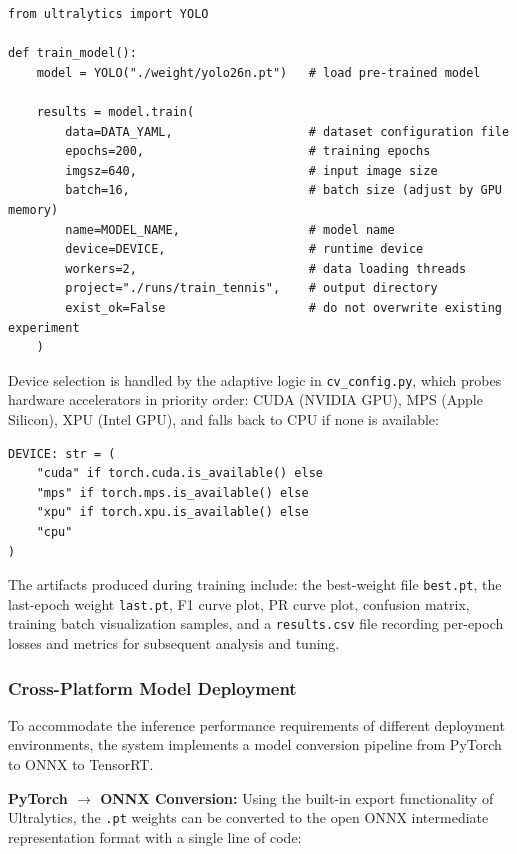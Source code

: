 \begin{verbatim}
from ultralytics import YOLO

def train_model():
    model = YOLO("./weight/yolo26n.pt")   # load pre-trained model

    results = model.train(
        data=DATA_YAML,                   # dataset configuration file
        epochs=200,                       # training epochs
        imgsz=640,                        # input image size
        batch=16,                         # batch size (adjust by GPU memory)
        name=MODEL_NAME,                  # model name
        device=DEVICE,                    # runtime device
        workers=2,                        # data loading threads
        project="./runs/train_tennis",    # output directory
        exist_ok=False                    # do not overwrite existing experiment
    )
\end{verbatim}

Device selection is handled by the adaptive logic in \texttt{cv\_config.py}, which probes hardware accelerators in priority order: CUDA (NVIDIA GPU), MPS (Apple Silicon), XPU (Intel GPU), and falls back to CPU if none is available:

\begin{verbatim}
DEVICE: str = (
    "cuda" if torch.cuda.is_available() else
    "mps" if torch.mps.is_available() else
    "xpu" if torch.xpu.is_available() else
    "cpu"
)
\end{verbatim}

The artifacts produced during training include: the best-weight file \texttt{best.pt}, the last-epoch weight \texttt{last.pt}, F1 curve plot, PR curve plot, confusion matrix, training batch visualization samples, and a \texttt{results.csv} file recording per-epoch losses and metrics for subsequent analysis and tuning.

\subsubsection{Cross-Platform Model Deployment}
\label{sec:cv:deploy}

To accommodate the inference performance requirements of different deployment environments, the system implements a model conversion pipeline from PyTorch to ONNX to TensorRT.

\textbf{PyTorch $\rightarrow$ ONNX Conversion:} Using the built-in export functionality of Ultralytics, the \texttt{.pt} weights can be converted to the open ONNX intermediate representation format with a single line of code:


